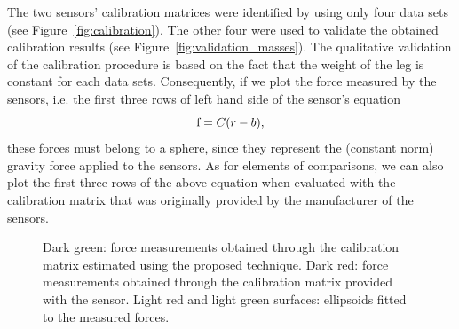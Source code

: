 The two sensors' calibration matrices were identified by using only four data sets (see Figure~\ref{fig:calibration}). 
The other four were used to validate the obtained calibration results (see Figure~\ref{fig:validation_masses}).
The qualitative validation of the calibration procedure is based on the fact that the weight of the leg is constant for each data sets.
Consequently, if we plot
the force measured by the sensors, i.e. the first three rows of left hand side of the sensor's equation
\[ {\rm f} = C(r - b), \]
these forces must belong to a sphere, since they represent the (constant norm) gravity force applied to the sensors.
As for elements of comparisons, we can also plot the first three rows of the above equation when evaluated with the calibration matrix that was 
originally provided by the
manufacturer of the sensors. 

\begin{figure}[ht]
\vspace{0.5em}
\centering
{}
\newline
{}
\caption{Dark green: force measurements obtained through the calibration matrix estimated using the proposed technique. Dark red:
force measurements obtained through the calibration matrix provided with the sensor. Light red and light green surfaces: ellipsoids fitted to the 
measured forces.}
\label{fig:validation}
\end{figure}


